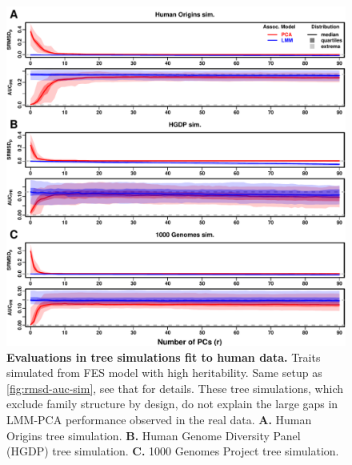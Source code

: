 \documentclass[11pt]{article}
\begin{document}
\begin{linenumbers}
\begin{figure}[hp]
  \centering
  \includegraphics[width=\textwidth,height=\textheight,keepaspectratio]{fes/rmsd-auc-real-sim.pdf}
  \caption{
    {\bf Evaluations in tree simulations fit to human data.}
    Traits simulated from FES model with high heritability.
    Same setup as \cref{fig:rmsd-auc-sim}, see that for details.
    These tree simulations, which exclude family structure by design, do not explain the large gaps in LMM-PCA performance observed in the real data.
    \textbf{A.}
    Human Origins tree simulation.
    \textbf{B.}
    Human Genome Diversity Panel (HGDP) tree simulation.
    \textbf{C.}
    1000 Genomes Project tree simulation.
  }
  \label{fig:rmsd-auc-real-sim}
\end{figure}


\end{linenumbers}
\end{document}
